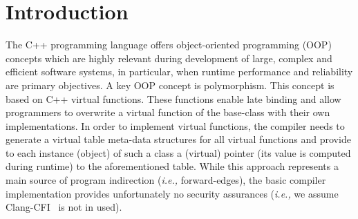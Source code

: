\section{Introduction}
\label{chapter:Introduction}

The C++ programming language offers object-oriented programming (OOP) concepts which are highly relevant 
during development of large, complex and efficient software systems, in particular, 
when runtime performance and reliability are primary objectives.
A key OOP concept is polymorphism. This concept is based on C++ virtual functions. These functions enable late binding and allow programmers 
to overwrite a virtual function of the base-class with their own implementations. In order to implement virtual functions, 
the compiler needs to generate a virtual table meta-data structures for all virtual functions and provide to each 
instance (object) of such a class a (virtual) pointer (its value is computed during runtime) to the aforementioned table.
While this approach represents a main source of program indirection (\textit{i.e.,} forward-edges), 
the basic compiler implementation provides unfortunately no security assurances 
(\textit{i.e.,} we assume Clang-CFI~\cite{clang:cfi} is not in used). 


